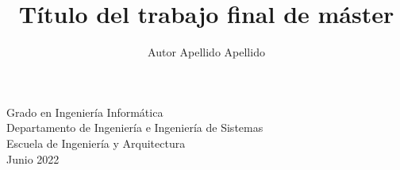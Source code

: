 \documentclass[a4paper,12pt,twoside,hidelinks,openright]{book}
\begin{document}
\begin{titlepage}
\begin{center}
\end{center}

\setcounter{footnote}{1}

\vspace*{35mm}
\fontsize{14pt}{14pt}\selectfont
\begin{center}
Grado en Ingeniería Informática\\ \medskip
Departamento de Ingeniería e Ingeniería de Sistemas\\
Escuela de Ingeniería y Arquitectura\\ \bigskip
Junio 2022\\
\end{center}


\renewcommand{\thefootnote}{\arabic{footnote}}
\end{titlepage}
\newpage


\title{Título del trabajo final de máster}
\author{Autor Apellido Apellido}

\pagebreak
\cleardoublepage
\baselineskip 19pt

\renewcommand{\labelitemi}{$-$}
\renewcommand{\tablename}{Tabla}

\renewcommand{\appendixname}{Anexos}
\renewcommand{\appendixtocname}{Anexos}
\renewcommand{\appendixpagename}{Anexos}





\cleardoublepage



\newpage


\newpage
\cleardoublepage

\newpage

\cleardoublepage
\renewcommand{\contentsname}{Índice}
\tableofcontents







\end{document}
